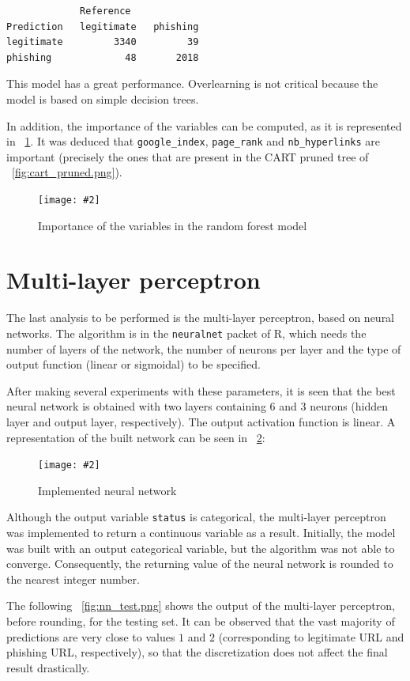 \documentclass[12pt, a4paper]{article}
\newcommand*{\figref}[1]{\figurename~\ref{fig:#1}}
\newcommand{\figcaption}[4][H]{
  \begin{figure}[#1]
    \centering
    \texttt{[image: \#2]}
    \caption{#3}
    \label{fig:#2}
  \end{figure}
}
\begin{document}
      \begin{verbatim}
             Reference
Prediction   legitimate   phishing
legitimate         3340         39
phishing             48       2018
      \end{verbatim}

      This model has a great performance. Overlearning is not critical because the model is based on simple decision trees.

      In addition, the importance of the variables can be computed, as it is represented in \figref{importance.png}. It was deduced that \texttt{google\_index}, \texttt{page\_rank} and \texttt{nb\_hyperlinks} are important (precisely the ones that are present in the CART pruned tree of \figref{cart_pruned.png}).

      \figcaption{importance.png}{Importance of the variables in the random forest model}{1}

  \newpage

  \section{Multi-layer perceptron}

    The last analysis to be performed is the multi-layer perceptron, based on neural networks. The algorithm is in the \texttt{neuralnet} packet of R, which needs the number of layers of the network, the number of neurons per layer and the type of output function (linear or sigmoidal) to be specified.

    After making several experiments with these parameters, it is seen that the best neural network is obtained with two layers containing $6$ and $3$ neurons (hidden layer and output layer, respectively). The output activation function is linear. A representation of the built network can be seen in \figref{nn.png}:

    \figcaption{nn.png}{Implemented neural network}{1}

    Although the output variable \texttt{status} is categorical, the multi-layer perceptron was implemented to return a continuous variable as a result. Initially, the model was built with an output categorical variable, but the algorithm was not able to converge. Consequently, the returning value of the neural network is rounded to the nearest integer number.

    The following \figref{nn_test.png} shows the output of the multi-layer perceptron, before rounding, for the testing set. It can be observed that the vast majority of predictions are very close to values $1$ and $2$ (corresponding to legitimate URL and phishing URL, respectively), so that the discretization does not affect the final result drastically.
\end{document}
